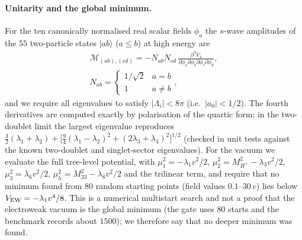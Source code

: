 \documentclass[twocolumn,epjc3]{svjour3}
\begin{document}
\paragraph{Unitarity and the global minimum.} For the ten canonically normalised real scalar fields $\phi_a$ the $s$-wave amplitudes of the $55$ two-particle states $|ab\rangle$ ($a\le b$) at high energy are
\begin{equation}
\begin{gathered}\mathcal M_{(ab),(cd)}=-N_{ab}N_{cd}\,\frac{\partial^4V_4}{\partial\phi_a\partial\phi_b\partial\phi_c\partial\phi_d},\\ N_{ab}=\begin{cases}1/\sqrt2&a=b\\1&a\neq b\end{cases},\end{gathered}
\label{eq:unit}
\end{equation}
and we require all eigenvalues to satisfy $|\Lambda_i|<8\pi$ (i.e.\ $|a_0|<1/2$). The fourth derivatives are computed exactly by polarisation of the quartic form; in the two-doublet limit the largest eigenvalue reproduces $\tfrac32(\lambda_1+\lambda_2)+\big[\tfrac94(\lambda_1-\lambda_2)^2+(2\lambda_3+\lambda_4)^2\big]^{1/2}$ (checked in unit tests against the known two-doublet and singlet-sector eigenvalues). For the vacuum we evaluate the full tree-level potential, with $\mu_1^2=-\lambda_1v^2/2$, $\mu_2^2=M_{H^+}^2-\lambda_3v^2/2$, $\mu_3^2=\lambda_6v^2/2$, $\mu_h^2=M_{33}^2-\lambda_8v^2/2$ and the trilinear term, and require that no minimum found from 80 random starting points (field values $0.1$--$30\,v$) lies below $V_{\rm EW}=-\lambda_1v^4/8$. This is a numerical multistart search and not a proof that the electroweak vacuum is the global minimum (the gate uses $80$ starts and the benchmark records about $1500$); we therefore say that no deeper minimum was found.
\end{document}

